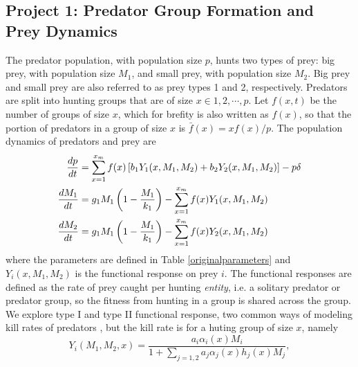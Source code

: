 \subsection{Project 1: Predator Group Formation and Prey Dynamics}
The predator population, with population size $p$, hunts two types of prey: big prey, with population size $M_1$, and small prey, with population size $M_2$. Big prey and small prey are also referred to as prey types 1 and 2, respectively. Predators are split into hunting groups that are of size $x \in 1, 2, \cdots, p$. Let $f(x,t)$ be the number of groups of size $x$, which for brefity is also written as $f(x)$, so that the portion of predators in a group of size $x$ is $\bar{f}(x) = x f(x)/p$. The population dynamics of predators and prey are 
\begin{subequations} \label{general_model}
\begin{align}
\frac{dp}{dt} &=  \sum_{x=1}^{x_{m}} f(x) \left[ b_1 Y_1(x,M_1,M_2) + b_2 Y_2(x,M_1,M_2) \right] - p \delta \\
\frac{dM_1}{dt} &= g_1 M_1 \left( 1 - \frac{M_1}{k_1} \right)  -  \sum_{x=1}^{x_{m}} f(x) Y_1(x,M_1,M_2) \\
\frac{dM_2}{dt} &= g_1 M_1 \left( 1 - \frac{M_1}{k_1} \right)  -  \sum_{x=1}^{x_{m}} f(x) Y_2(x,M_1,M_2)
\end{align}
\end{subequations}
where the parameters are defined in Table \ref{originalparameters} and $Y_i(x,M_1,M_2)$ is the functional response on prey $i$. The functional responses are defined as the rate of prey caught per hunting \textit{entity}, i.e. a solitary predator or predator group, so the fitness from hunting in a group is shared across the group. We explore type I and type II functional response, two common ways of modeling kill rates of predators \cite{hamilton_genetical_1964}, but the kill rate is for a huting group of size $x$, namely
\begin{equation} \label{fun_response}
Y_i(M_1, M_2, x) = \frac{a_i \alpha_i(x) M_i}{1 + \sum_{j=1,2} a_j \alpha_j(x) h_j(x) M_j}, 
\end{equation}	
